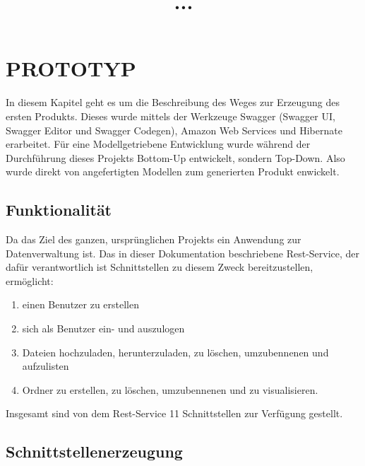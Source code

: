 \documentclass[a4paper,twoside]{article}
\begin{document}
\title{\uppercase{...}}

\author{
}



\onecolumn \maketitle \normalsize \vfill

\section{\uppercase{Prototyp}}

In diesem Kapitel geht es um die Beschreibung des Weges zur Erzeugung des ersten Produkts. Dieses wurde mittels der Werkzeuge Swagger \cite{swagger} (Swagger UI, Swagger Editor und Swagger Codegen), Amazon Web Services und Hibernate erarbeitet. F\"ur eine Modellgetriebene Entwicklung wurde w\"ahrend der Durchf\"uhrung dieses Projekts Bottom-Up entwickelt, sondern Top-Down. Also wurde direkt von angefertigten Modellen zum generierten Produkt enwickelt.
	
	\subsection{Funktionalit\"at}
	
	Da das Ziel des ganzen, urspr\"unglichen Projekts ein Anwendung zur Datenverwaltung ist. Das in dieser Dokumentation beschriebene Rest-Service, der daf\"ur verantwortlich ist Schnittstellen zu diesem Zweck bereitzustellen, erm\"oglicht:
	\begin{enumerate}
		\item einen Benutzer zu erstellen
		\item sich als Benutzer ein- und auszulogen
		\item Dateien hochzuladen, herunterzuladen, zu l\"oschen, umzubennenen und aufzulisten
		\item Ordner zu erstellen, zu l\"oschen, umzubennenen und zu visualisieren.
	\end{enumerate}
	
	Insgesamt sind von dem Rest-Service 11 Schnittstellen zur Verf\"ugung gestellt.
	
	\subsection{Schnittstellenerzeugung}
	
\end{document}
